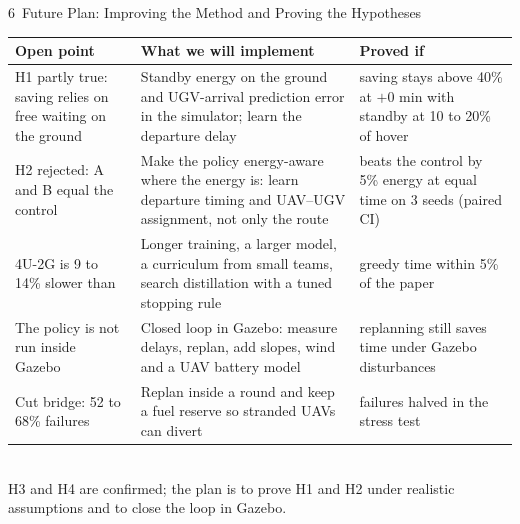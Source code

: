 \begin{frame}{6 \,Future Plan: Improving the Method and Proving the Hypotheses}
\centering\scriptsize
\renewcommand{\arraystretch}{1.35}
\begin{tabular}{@{}P{3.3cm}P{5.7cm}P{3.5cm}@{}}
\toprule
\textbf{Open point} & \textbf{What we will implement} & \textbf{Proved if}\\
\midrule
H1 partly true: saving relies on free waiting on the ground & Standby energy on the ground and UGV-arrival prediction error in the simulator; learn the departure delay & saving stays above 40\% at $+0$ min with standby at 10 to 20\% of hover\\
H2 rejected: A and B equal the control & Make the policy energy-aware where the energy is: learn departure timing and UAV--UGV assignment, not only the route & beats the control by 5\% energy at equal time on 3 seeds (paired CI)\\
4U-2G is 9 to 14\% slower than~\cite{base} & Longer training, a larger model, a curriculum from small teams, search distillation with a tuned stopping rule & greedy time within 5\% of the paper\\
The policy is not run inside Gazebo~\cite{gazebo} & Closed loop in Gazebo: measure delays, replan, add slopes, wind and a UAV battery model & replanning still saves time under Gazebo disturbances\\
Cut bridge: 52 to 68\% failures & Replan inside a round and keep a fuel reserve so stranded UAVs can divert & failures halved in the stress test\\
\bottomrule
\end{tabular}\\[2mm]
{\small H3 and H4 are confirmed; the plan is to prove H1 and H2 under realistic assumptions and to close the loop in Gazebo.}
\end{frame}

